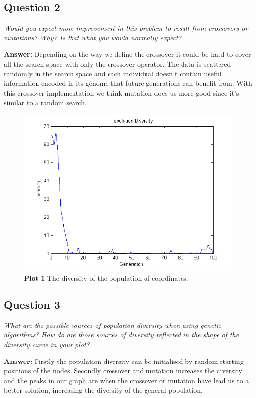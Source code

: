 \documentclass[a4paper]{article}
\begin{document}
\subsection*{Question 2}
\emph{Would you expect more improvement in this problem to result
from crossovers or mutations? Why? Is that what you would normally expect?}

\textbf{Answer:} Depending on the way we define the crossover it could be hard to cover all the search space with only the crossover operator. The data is scattered randomly in the search space and each individual doesn't contain useful information encoded in its genome that future generations can benefit from. With this crossover implementation we think mutation does us more good since it's similar to a random search. 

\begin{figure}[H] %
	\includegraphics[scale=0.7]{populationDiversityStars.png}
	\caption{\label{fig:plot1Diversity}\textbf{Plot 1} The diversity of the population of coordinates.}
\end{figure}

\subsection*{Question 3}
\emph{What are the possible sources of population diversity when using
genetic algorithms? How do are those sources of diversity reflected in the shape of the diversity curve in your plot?}

\textbf{Answer:} 
Firstly the population diversity can be initialised by random starting positions of the nodes. Secondly crossover and mutation increases the diversity and the peaks in our graph are when the crossover or mutation have lead us to a better solution, increasing the diversity of the general population. 
\end{document}
